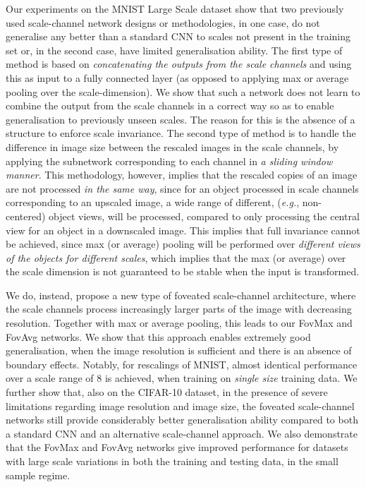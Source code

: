 \documentclass[twocolumn,runningheads]{svjour3}
\begin{document}
Our experiments on the MNIST Large Scale dataset show that two
previously used scale-channel network designs or
methodologies, in one case, do not generalise any better than a standard CNN to scales not present in the training set or, in the second case, have limited generalisation ability.
The first type of method is based on
{\em concatenating the outputs from the scale channels\/} and using
this as input to a fully connected layer (as opposed to applying max
or average pooling over the scale-dimension). We show that such a
network does not learn to combine the output from the scale channels
in a correct way so as to enable generalisation to previously unseen
scales. The reason for this is the absence of a structure to enforce
scale invariance. The second type of method is to handle the difference in
image size between the rescaled images in the scale channels, by applying the subnetwork
corresponding to each channel in {\em a sliding window manner}. This
methodology, however, implies that the rescaled copies of an image are
not processed {\em in the same way\/}, since for an object processed in
scale channels corresponding to an upscaled image, a wide range of
different, ({\em e.g.\/}, non-centered) object views, will be processed, compared
to only processing the central view for an object in a downscaled
image. This implies that full invariance cannot be achieved, since max (or
average) pooling will be performed over {\em different views of the objects
  for different scales\/}, which implies that the max (or average) over
the scale dimension is not guaranteed to be stable when the input
is transformed.

We do, instead, propose a new type of foveated scale-channel architecture, 
where the scale channels process increasingly larger parts of the image 
with decreasing resolution. Together with max or average pooling,
this leads to our FovMax and FovAvg networks. 
We show that this approach enables extremely good generalisation,
when the image resolution is sufficient and there is an absence 
of boundary effects. Notably, for rescalings of MNIST, 
almost identical performance over a scale range of 8 is achieved, 
when training on {\em single size\/} training data. 
We further show that, also on the CIFAR-10 dataset, in the presence 
of severe limitations regarding image resolution and image size, 
the foveated scale-channel networks still provide considerably 
better generalisation ability compared to both a standard CNN 
and an alternative scale-channel approach.
We also demonstrate that the FovMax and FovAvg networks give improved
performance for datasets with large scale variations in both the
training and testing data, in the small sample regime. 
\end{document}
